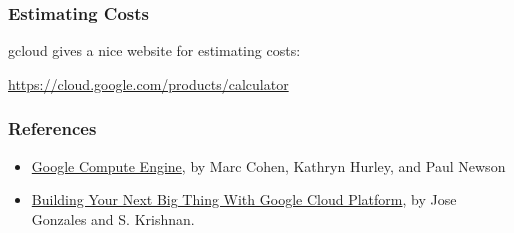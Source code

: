 \documentclass[9pt]{beamer}
\begin{document}
\begin{frame}[fragile]
\frametitle{Estimating Costs}
gcloud gives a nice website for estimating costs: 

\href{https://cloud.google.com/products/calculator}{https://cloud.google.com/products/calculator}
\end{frame}

\begin{frame}[fragile]
  \frametitle{References}
  \begin{itemize}
  \item \href{http://www.amazon.com/Google-Compute-Engine-Marc-Cohen/dp/1449360882/ref=sr_1_1?ie=UTF8&qid=1452552286&sr=8-1&keywords=Google+Compute+Engine}{Google Compute Engine}, by Marc Cohen, Kathryn Hurley, and Paul Newson
  \item \href{http://www.amazon.com/Building-Thing-Google-Cloud-Platform/dp/1484210050/ref=pd_sim_14_2?ie=UTF8&dpID=51NfTEhpFlL&dpSrc=sims&preST=_AC_UL160_SR11\%2C160_&refRID=1XA05PG1Q6D5NW63685Y}{Building Your Next Big Thing With Google Cloud Platform}, by Jose Gonzales and S. Krishnan.
  \end{itemize}
\end{frame}
\end{document}

